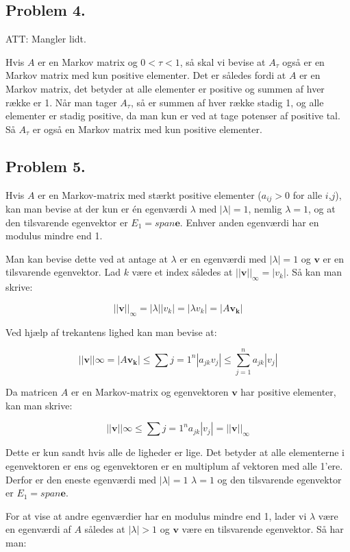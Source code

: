 \subsection*{Problem 4.}
ATT: Mangler lidt.


Hvis $A$ er en Markov matrix og $0 < \tau < 1$, så skal vi bevise at $A_{\tau}$ også er en Markov matrix med kun positive elementer. Det er således fordi at $A$ er en Markov matrix, det betyder at alle elementer er positive og summen af hver række er 1. Når man tager $A_{\tau}$, så er summen af hver række stadig 1, og alle elementer er stadig positive, da man kun er ved at tage potenser af positive tal. Så $A_{\tau}$ er også en Markov matrix med kun positive elementer.

\subsection*{Problem 5.}

Hvis $A$ er en Markov-matrix med stærkt positive elementer ($a_{ij} > 0$ for alle $i$,$j$), kan man bevise at der kun er én egenværdi $\lambda$ med $|\lambda| = 1$, nemlig $\lambda = 1$, og at den tilsvarende egenvektor er $E_1 = span {\mathbf{e}}$. Enhver anden egenværdi har en modulus mindre end 1.

Man kan bevise dette ved at antage at $\lambda$ er en egenværdi med $|\lambda| = 1$ og $\mathbf{v}$ er en tilsvarende egenvektor. Lad $k$ være et index således at $||\mathbf{v}||_\infty = |v_k|$. Så kan man skrive:

$$||\mathbf{v}||_\infty = |\lambda ||v_k| = |\lambda v_k| = |A\mathbf{v_k}|$$

Ved hjælp af trekantens lighed kan man bevise at:

$$||\mathbf{v}||\infty = |A\mathbf{v_k}| \leq \sum{j=1}^n |a_{jk} v_j| \leq \sum_{j=1}^n a_{jk} |v_j|$$

Da matricen $A$ er en Markov-matrix og egenvektoren $\mathbf{v}$ har positive elementer, kan man skrive:

$$||\mathbf{v}||\infty \leq \sum{j=1}^n a_{jk} |v_j| = ||\mathbf{v}||_\infty$$

Dette er kun sandt hvis alle de ligheder er lige. Det betyder at alle elementerne i egenvektoren er ens og egenvektoren er en multiplum af vektoren med alle 1'ere. Derfor er den eneste egenværdi med $|\lambda| = 1$ $\lambda = 1$ og den tilsvarende egenvektor er $E_1 = span {\mathbf{e}}$.

For at vise at andre egenværdier har en modulus mindre end 1, lader vi $\lambda$ være en egenværdi af $A$ således at $|\lambda| > 1$ og $\mathbf{v}$ være en tilsvarende egenvektor. Så har man:

